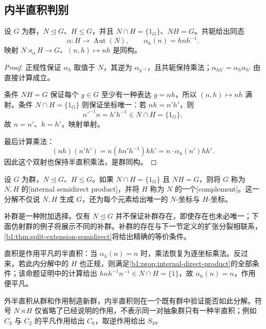 \subsection{内半直积判别}
\label{b1:subsec:0602:02}

\begin{theorem}[内半直积判别]\label{b1:thm:internal-semidirect}
	设 \(G\) 为群，\(N\trianglelefteq G\)、\(H\leq G\)，并且 \(N\cap H=\{1_G\}\)、\(NH=G\)。共轭给出同态
	\[
		\alpha:H\longrightarrow\operatorname{Aut}(N),\qquad \alpha_h(n)=hnh^{-1}.
	\]
	映射 \(N\rtimes_\alpha H\rightarrow G\)、\((n,h)\mapsto nh\) 是同构。
\end{theorem}
\begin{proof}
	正规性保证 \(\alpha_h\) 取值于 \(N\)，其逆为 \(\alpha_{h^{-1}}\)，且共轭保持乘法；\(\alpha_{hh'}=\alpha_h\alpha_{h'}\) 由直接计算成立。

	条件 \(NH=G\) 保证每个 \(g\in G\) 至少有一种表达 \(g=nh\)，所以 \((n,h)\mapsto nh\) 满射。条件 \(N\cap H=\{1_G\}\) 则保证坐标唯一：若 \(nh=n'h'\)，则
	\[
		n'^{-1}n=h'h^{-1}\in N\cap H=\{1_G\},
	\]
	故 \(n=n'\)、\(h=h'\)，映射单射。

	最后计算乘法：
	\[
		(nh)(n'h')=n(hn'h^{-1})hh'=n\cdot\alpha_h(n')hh'.
	\]
	因此这个双射也保持半直积乘法，是群同构。
\end{proof}

设 \(G\) 为群，\(N\trianglelefteq G\)、\(H\leq G\)。如果 \(N\cap H=\{1_G\}\) 且 \(NH=G\)，则将 \(G\) 称为 \(N,H\) 的[internal semidirect product]，并将 \(H\) 称为 \(N\) 的一个[complement]。这一分解不仅说 \(N,H\) 生成 \(G\)，还为每个元素给出唯一的 \(N\)-坐标与 \(H\)-坐标。

\ProseParagraphBreak
补群是一种附加选择。仅有 \(N\trianglelefteq G\) 并不保证补群存在，即使存在也未必唯一；下面仿射群的例子将展示不同的补群。补群的存在与下一节定义的扩张分裂相联系，\cref{b1:thm:split-extension-semidirect}将给出精确的等价条件。

\ProseParagraphBreak
直积是作用平凡的半直积：当 \(\alpha_h(n)=n\) 时，乘法恢复为逐坐标乘法。反过来，若此内分解中的 \(H\) 也正规，则满足\cref{b1:prop:internal-direct-product}的全部条件；该命题证明中的计算给出 \(hnh^{-1}n^{-1}\in N\cap H=\{1\}\)，故 \(\alpha_h(n)=n\)，作用便平凡。

\ProseParagraphBreak
外半直积从群和作用制造新群，内半直积则在一个既有群中验证能否如此分解。符号 \(N\rtimes H\) 仅省略了已经说明的作用，不表示同一对抽象群只有一种半直积；例如 \(C_3\) 与 \(C_2\) 的平凡作用给出 \(C_6\)，取逆作用给出 \(S_3\)。

